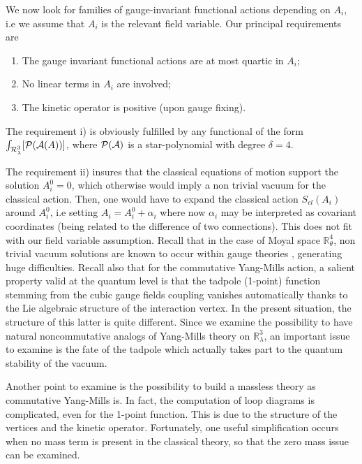 \documentclass[11pt]{book}
\newcommand{\Rcal}{\mathcal{R}}
\theoremstyle{break}
\begin{document}
We now look for families of gauge-invariant functional actions depending on $A_i$, i.e we assume that $A_i$ is the relevant field variable. Our principal requirements are
%
\begin{enumerate}
\item The gauge invariant functional actions are at most quartic in $A_i$;
\item No linear terms in $A_i$ are involved;
\item The kinetic operator is positive (upon gauge fixing).
\end{enumerate}


The requirement i) is obviously fulfilled by any functional of the form $\int_{\Rcal^3_\lambda}[{\cal{P}}({\cal{A}}(A))]$, where ${\cal{P}}({\cal{A}})$ is a star-polynomial with degree $\delta=4$.\par 
The requirement ii) insures that the classical equations of motion support the solution $A^0_i=0$, which otherwise would imply a non trivial vacuum for the classical action. Then, one would have to expand the classical action $S_{cl}(A_i)$ around $A^0_i$, i.e setting $A_i=A^0_i+\alpha_i$ where now $\alpha_i$ may be interpreted as covariant coordinates (being related to the difference of two connections). This does not fit with our field variable assumption. Recall that in the case of Moyal space $\mathbb{R}^4_\theta$, non trivial vacuum solutions are known to occur within gauge theories \cite{Wallet:2007c}, \cite{GWW2} generating huge difficulties. Recall also that for the commutative Yang-Mills action, a salient property valid at the quantum level is that the tadpole (1-point) function stemming from the cubic gauge fields coupling vanishes automatically thanks to the Lie algebraic structure of the interaction vertex. In the present situation, the structure of this latter is quite different. Since we examine the possibility to have natural noncommutative analogs of Yang-Mills theory on $\mathbb{R}^3_\lambda$, an important issue to examine is the fate of the tadpole which actually takes part to the quantum stability of the vacuum. \par 

Another point to examine is the possibility to build a massless theory as commutative Yang-Mills is. In fact, the computation of loop diagrams is complicated, even for the 1-point function. This is due to the structure of the vertices and the kinetic operator. Fortunately, one useful simplification occurs when no mass term is present in the classical theory, so that the zero mass issue can be examined. \par
\end{document}
